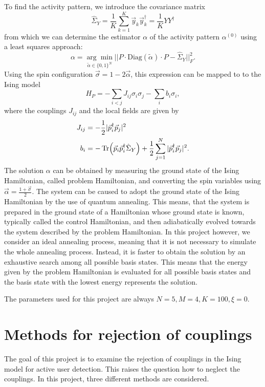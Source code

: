 \documentclass{article}
\begin{document}
	To find the activity pattern, we introduce the covariance matrix
	\begin{equation}
		\hat{\Sigma}_Y = \frac{1}{K}\sum\limits_{k=1}^K\vec y_k \vec y_k^\dagger = \frac{1}{K}YY^\dagger
	\end{equation}
	from which we can determine the estimator $\alpha$ of the activity pattern $\alpha^{(0)}$ using a least squares approach:
	\begin{equation}
		\alpha = \underset{\tilde{\alpha}\in\{0,1\}^N}{\arg\min}||P\cdot\mathrm{Diag}(\tilde{\alpha})\cdot P - \hat{\Sigma}_Y||_F^2.
	\end{equation}
	Using the spin configuration $\vec\sigma = 1-2\vec\alpha$, this expression can be mapped to to the Ising model
	\begin{equation}
		H_P = -\sum\limits_{i<j}J_{ij}\sigma_i\sigma_j - \sum_i b_i\sigma_i,
	\end{equation}
	where the couplings $J_{ij}$ and the local fields are given by
	\begin{align}
		J_{ij} &= -\frac{1}{2}|\vec p_i^\dagger \vec p_j|^2 \\
		b_i &= -\Tr(\vec p_i\vec p_i^\dagger\hat{\Sigma}_Y)+\frac{1}{2}\sum\limits_{j=1}^N|\vec p_i^\dagger \vec p_j|^2.
	\end{align}
	The solution $\alpha$ can be obtained by measuring the ground state of the Ising Hamiltonian, called problem Hamiltonian, and converting the spin variables using $\vec \alpha = \frac{1+\vec\sigma}{2}$. The system can be caused to adopt the ground state of the Ising Hamiltonian by the use of quantum annealing. This means, that the system is prepared in the ground state of a Hamiltonian whose ground state is known, typically called the control Hamiltonian, and then adiabatically evolved towards the system described by the problem Hamiltonian. In this project however, we consider an ideal annealing process, meaning that it is not necessary to simulate the whole annealing process. Instead, it is faster to obtain the solution by an exhaustive search among all possible basis states. This means that the energy given by the problem Hamiltonian is evaluated for all possible basis states and the basis state with the lowest energy represents the solution. 
	
	The parameters used for this project are always $N=5, M=4, K=100, \xi=0$.
	
	\section{Methods for rejection of couplings}\label{sec:methods for rejection of couplings}
	The goal of this project is to examine the rejection of couplings in the Ising model for active user detection. This raises the question how to neglect the couplings. In this project, three different methods are considered. 
\end{document}
